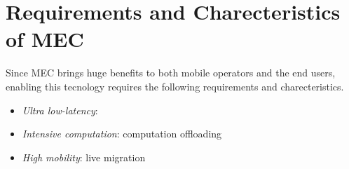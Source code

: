 \section{Requirements and Charecteristics of MEC}  \label{requirements}

Since MEC brings huge benefits to both mobile operators and the end users, enabling this tecnology requires the following requirements and charecteristics.

\begin{itemize}

\item \textit{\textit{Ultra low-latency}}:

\item \textit{\textit{Intensive computation}}: computation offloading

\item \textit{\textit{High mobility}}: live migration

\end{itemize}
